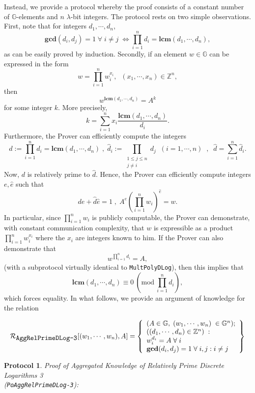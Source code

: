 \documentclass[11pt, lettersize, notitlepage, leqno, footskip=0.6cm]{article}
\newcommand{\bz}{\mathbb Z}
\newcommand{\pl}{\prod\limits}
\newcommand{\slim}{\sum\limits}
\newcommand{\LRA}{\Longleftrightarrow}
\newcommand{\mc}{\mathcal}
\newcommand{\mb}{\mathbb}
\newcommand{\mbf}{\mathbf}
\newcommand{\lam}{\lambda}
\newcommand{\what}{\widehat}
\newcommand{\vs}{\vspace{-0.15cm}}
\newcommand{\Mod}[1]{\ (\mathrm{mod}\ #1)}
\newcommand{\LCM}{\mbf{lcm}}
\newcommand{\GCD}{\mbf{gcd}}
\newtheorem{Prot}[Thm]{Protocol}
\numberwithin{equation}{section}
\begin{document}
Instead, we provide a protocol whereby the proof consists of a constant number of $\mb{G}$-elements and $n$ $\lam$-bit integers. The protocol rests on two simple observations. First, note that for integers $d_1,\cdots,d_n$, \vs $$\GCD(d_i,d_j)=1\;\forall\;i\neq j\; \LRA \pl_{i=1}^n d_i= \LCM(d_1,\cdots,d_n),$$ as can be easily proved by induction. Secondly, if an element $w\in \mb{G}$ can be expressed in the form \vspace{-0.15cm}$$w = \prod\limits_{i=1}^n w_i^{x_i},\;\;(x_1,\cdots,x_n)\in\bz^n,$$ then \vs $$w^{\LCM(d_1,\cdots,d_n)} = A^{k} $$ for some integer $k$. More precisely, \vs $$k = \slim_{i=1}^n x_i\frac{\LCM(d_1,\cdots,d_n)}{d_i}.$$ Furthermore, the Prover can efficiently compute the integers \vs $$d:= \pl_{i=1}^n d_i = \LCM(d_1,\cdots,d_n)\;,\;\what{d}_i:= \pl_{\substack{1\leq j\leq n\\ j\neq i}} d_j\;\; (i=1,\cdots,n)\;\;,\;\; \what{d} = \slim_{i=1}^n \what{d}_i.$$ Now, $d$ is relatively prime to $\what{d}$. Hence, the Prover can efficiently compute integers $e,\what{e}$ such that $$de+\what{d}\what{e} = 1\;,\; A^e(\pl_{i=1}^n w_i)^{\what{e}} = w.  $$ In particular, since $\pl_{i=1}^n w_i$ is publicly computable, the Prover can demonstrate, with constant communication complexity, that $w$ is expressible as a product $\pl_{i=1}^n w_i^{x_i}$ where the $x_i$ are integers known to him. If the Prover can also demonstrate that $$w^{\prod\limits_{i=1}^n d_i} = A,$$ (with a subprotocol virtually identical to \verb|MultPolyDLog|), then this implies that \vspace{-0.15cm}$$\LCM(d_1,\cdots,d_n)\equiv 0\Mod{ \prod\limits_{i=1}^n d_i},$$ which forces equality. In what follows, we provide an argument of knowledge for the relation 

\[
  \mc{R}_{{\protect\verb|AggRelPrimeDLog-3|}}[(w_1,\cdots, w_n), A] = \left\{\begin{array}{l}
    (A\in\mb{G},\; (w_1,\cdots, w_n)\;\in\mb{G}^n);\\
    ((d_1,\cdots,d_n)\in\bz^n)\;: \\
    w_i^{d_i} = A\;\forall\;i\\
   	\GCD(d_i, d_j) = 1\;\forall \;i,j: i\neq j
  \end{array}\right\}
\] 

\vspace{0.2cm}



\begin{Prot} \normalfont \textit{Proof of Aggregated Knowledge of Relatively Prime Discrete Logarithms} 3\\ (\verb|PoAggRelPrimeDLog-3|):\end{Prot} \vspace{-0.3cm}
\end{document}
